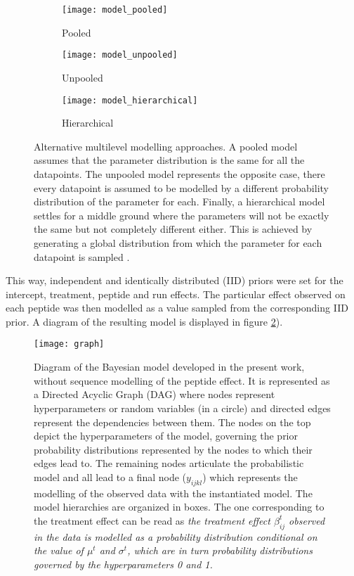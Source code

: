 \begin{figure}[H]
\centering
\begin{subfigure}{.9\textwidth}
\centering
\caption*{Pooled}
\texttt{[image: model\_pooled]}
\end{subfigure}
\bigskip
\begin{subfigure}{.9\textwidth}
\centering
\caption*{Unpooled}
\texttt{[image: model\_unpooled]}
\end{subfigure}
\bigskip
\begin{subfigure}{.9\textwidth}
\centering
\caption*{Hierarchical}
\texttt{[image: model\_hierarchical]}
\end{subfigure}
\caption[]{Alternative multilevel modelling approaches. A pooled model assumes that the parameter distribution is the same for all the datapoints.  The unpooled model represents the opposite case, there every datapoint is assumed to be modelled by a different probability distribution of the parameter for each. Finally, a hierarchical model settles for a middle ground where the parameters will not be exactly the same but not completely different either. This is achieved by generating a global distribution from which the parameter for each datapoint is sampled \footnotemark{}.}
\label{fig:multilevel}
\end{figure}



This way, independent and identically distributed (\ac{IID}) priors were set for the intercept, treatment, peptide and run effects. The particular effect observed on each peptide was then modelled as a value sampled from the corresponding \ac{IID} prior. A diagram of the resulting model is displayed in figure \ref{fig:daft_model}).

\begin{figure}[!h]
\centering
\texttt{[image: graph]}
\caption{Diagram of the Bayesian model developed in the present work, without sequence modelling of the peptide effect. It is represented as a Directed Acyclic Graph (\ac{DAG}) where nodes represent hyperparameters or random variables (in a circle) and directed edges  represent the dependencies between them. The nodes on the top depict the hyperparameters of the model, governing the prior probability distributions represented by the nodes to which their edges lead to. The remaining nodes articulate the probabilistic model and all lead to a final node ($y_{ijkl}$) which represents the modelling of the observed data with the instantiated model. The model hierarchies are organized in boxes. The one corresponding to the treatment effect can be read as \textit{the treatment effect $\beta_{ij}^{t}$ observed in the data is modelled as a probability distribution conditional on the value of $\mu^t$ and $\sigma^t$, which are in turn probability distributions governed by the hyperparameters 0 and 1.}}
\label{fig:daft_model}
\end{figure}

